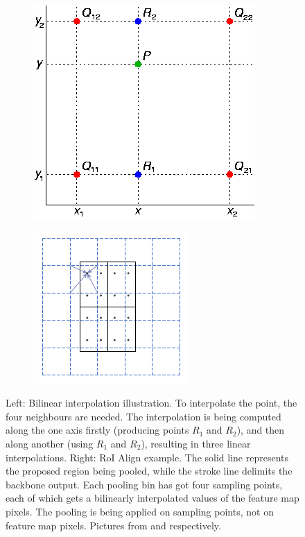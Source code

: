 \documentclass[thesis=B,english]{FITthesis}[2019/12/23]
\begin{document}
\begin{figure}[h]
	\centering
	
	\begin{subfigure}[b]{.48\textwidth}
		\centering
		\includegraphics[scale=0.4]{images/bilinear_interpolation.png}
	\end{subfigure}
	\begin{subfigure}[b]{0.48\textwidth}
		\centering
		\includegraphics[scale=0.7]{images/roi_align.png}
	\end{subfigure}
	
	\caption{Left: Bilinear interpolation illustration. To interpolate the point, the four neighbours are needed. The interpolation is being computed along the one axis firstly (producing points $R_1$ and $R_2$), and then along another (using $R_1$ and $R_2$), resulting in three linear interpolations. Right: RoI Align example. The solid line represents the proposed region being pooled, while the stroke line delimits the backbone output. Each pooling bin has got four sampling points, each of which gets a bilinearly interpolated values of the feature map pixels. The pooling is being applied on sampling points, not on feature map pixels. Pictures from \cite{bilinear_interpolation} and \cite{mask_rcnn} respectively.}
\end{figure}
\end{document}
